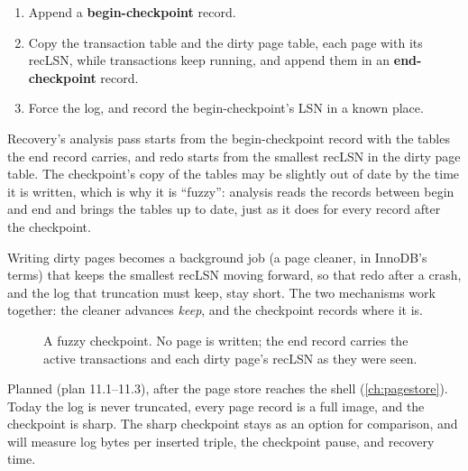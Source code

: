 \begin{enumerate}
\item Append a \textbf{begin-checkpoint} record.
\item Copy the transaction table and the dirty page table, each page with its
recLSN, while transactions keep running, and append them in an
\textbf{end-checkpoint} record.
\item Force the log, and record the begin-checkpoint's LSN in a known place.
\end{enumerate}

Recovery's analysis pass starts from the begin-checkpoint record with the
tables the end record carries, and redo starts from the smallest recLSN in
the dirty page table. The checkpoint's copy of the tables may be slightly out
of date by the time it is written, which is why it is ``fuzzy'': analysis reads
the records between begin and end and brings the tables up to date, just as
it does for every record after the checkpoint.

Writing dirty pages becomes a background job (a page cleaner, in InnoDB's
terms) that keeps the smallest recLSN moving forward, so that redo after a
crash, and the log that truncation must keep, stay short. The two mechanisms
work together: the cleaner advances \textit{keep}, and the checkpoint records
where it is.

\begin{figure}[ht]
\centering
{}
\caption{A fuzzy checkpoint. No page is written; the end record carries the
active transactions and each dirty page's recLSN as they were seen.}
\end{figure}

\begin{status}
Planned (plan 11.1--11.3), after the page store reaches the shell
(\cref{ch:pagestore}). Today the log is never truncated, every page record is a
full image, and the checkpoint is sharp. The sharp checkpoint stays as an
option for comparison, and  will measure log bytes per
inserted triple, the checkpoint pause, and recovery time.
\end{status}

